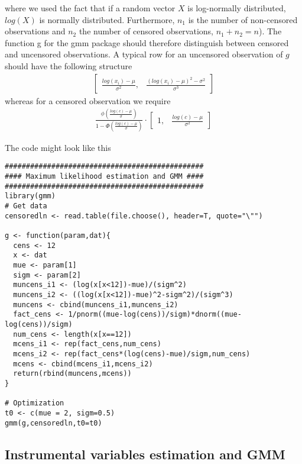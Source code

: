 \documentclass{article}
\begin{document}
\begin{solution}
\begin{enumerate}
\begin{equation*}
\end{equation*}
where we used the fact that if a random vector $X$ is log-normally distributed, $log(X)$ is normally distributed. Furthermore, $n_1$ is the number of non-censored observations and $n_2$ the number of censored observations, $n_1+n_2=n$). The function g for the gmm package should therefore distinguish between censored and uncensored observations. A typical row for an uncensored observation of $g$ should have the following  structure
\begin{align*}
\begin{bmatrix}
  \frac{log(x_i)-\mu}{\sigma^2}, & \frac{(log(x_i)-\mu)^2-\sigma^2}{\sigma^3}
\end{bmatrix}
\end{align*}
whereas for a censored observation we require
\begin{align*}
\frac{\phi\left(\frac{log(c)-\mu}{\sigma}\right) }{1-\Phi\left(\frac{log(c)-\mu}{\sigma}\right)} \cdot
\begin{bmatrix}
  1, & \frac{log(c)-\mu}{\sigma^2}
\end{bmatrix}
\end{align*}

The code might look like this
\begin{verbatim}
###############################################
#### Maximum likelihood estimation and GMM ####
###############################################
library(gmm)
# Get data
censoredln <- read.table(file.choose(), header=T, quote="\"")

g <- function(param,dat){
  cens <- 12
  x <- dat
  mue <- param[1]
  sigm <- param[2]
  muncens_i1 <- (log(x[x<12])-mue)/(sigm^2)
  muncens_i2 <- ((log(x[x<12])-mue)^2-sigm^2)/(sigm^3)
  muncens <- cbind(muncens_i1,muncens_i2)
  fact_cens <- 1/pnorm((mue-log(cens))/sigm)*dnorm((mue-log(cens))/sigm)
  num_cens <- length(x[x==12])
  mcens_i1 <- rep(fact_cens,num_cens)
  mcens_i2 <- rep(fact_cens*(log(cens)-mue)/sigm,num_cens)
  mcens <- cbind(mcens_i1,mcens_i2)
  return(rbind(muncens,mcens))
}

# Optimization
t0 <- c(mue = 2, sigm=0.5)
gmm(g,censoredln,t0=t0)
\end{verbatim}
\end{enumerate}
\end{solution}

\subsection{Instrumental variables estimation and GMM}
\end{document}
